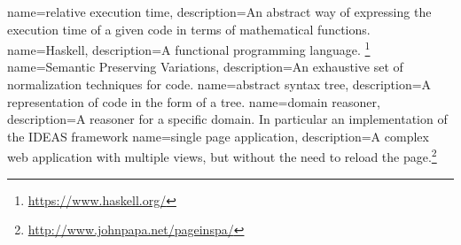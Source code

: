 {
  name=relative execution time,
  description={An abstract way of expressing the execution time
    of a given \gls{code} in terms of mathematical functions.}
}
{
  name=Haskell,
  description={A functional programming language.
  \footnote{\url{https://www.haskell.org/}}}
}
{
  name=Semantic Preserving Variations,
  description={An exhaustive set of normalization techniques for \gls{code}.}
}
{
  name=abstract syntax tree,
  description={A representation of \gls{code} in the form of a tree.}
}
{
  name=domain reasoner,
  description={A reasoner for a specific domain. In particular an implementation
    of the IDEAS framework}
}
{
  name=single page application,
  description={A complex web application with multiple views,
    but without the need to reload
    the page.\footnote{\url{http://www.johnpapa.net/pageinspa/}}}
}
